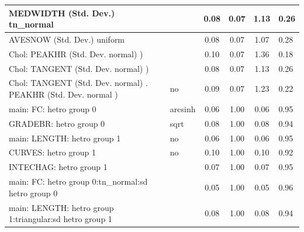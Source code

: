 \begin{table}
\begin{center}
\begin{tabular}{|l|l|c|c|c|l|}
			\hline
			MEDWIDTH (Std. Dev.) tn_normal &  & 0.08 & 0.07 & 1.13 & 0.26 \\
			\hline
			AVESNOW (Std. Dev.) uniform &  & 0.08 & 0.07 & 1.07 & 0.28 \\
			\hline
			 Chol: PEAKHR (Std. Dev. normal) ) &  & 0.10 & 0.07 & 1.36 & 0.18 \\
			\hline
			 Chol: TANGENT (Std. Dev. normal) ) &  & 0.08 & 0.07 & 1.13 & 0.26 \\
			\hline
			 Chol: TANGENT (Std. Dev. normal) . PEAKHR (Std. Dev.   normal ) & no & 0.09 & 0.07 & 1.23 & 0.22 \\
			\hline
			main: FC: hetro group 0 & arcsinh & 0.06 & 1.00 & 0.06 & 0.95 \\
			\hline
			GRADEBR: hetro group 0 & sqrt & 0.08 & 1.00 & 0.08 & 0.94 \\
			\hline
			main: LENGTH: hetro group 1 & no & 0.06 & 1.00 & 0.06 & 0.95 \\
			\hline
			CURVES: hetro group 1 & no & 0.10 & 1.00 & 0.10 & 0.92 \\
			\hline
			INTECHAG: hetro group 1 &  & 0.07 & 1.00 & 0.07 & 0.95 \\
			\hline
			main: FC: hetro group 0:tn_normal:sd  hetro group 0 &  & 0.05 & 1.00 & 0.05 & 0.96 \\
			\hline
			main: LENGTH: hetro group 1:triangular:sd  hetro group 1 &  & 0.08 & 1.00 & 0.08 & 0.94 \\
			\hline
		\end{tabular}
	\end{center}
\end{table}